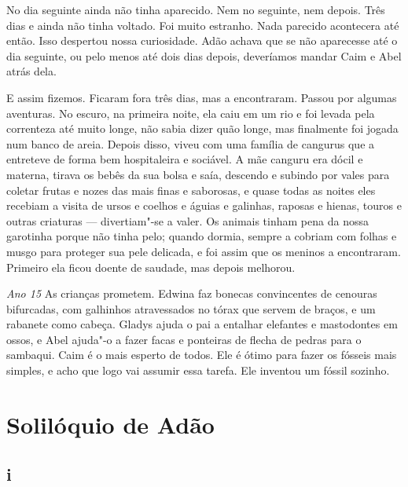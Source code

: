 No dia seguinte ainda não tinha aparecido. Nem no seguinte, nem depois.
Três dias e ainda não tinha voltado. Foi muito estranho. Nada parecido
acontecera até então. Isso despertou nossa curiosidade. Adão achava
que se não aparecesse até o dia seguinte, ou pelo menos até dois dias depois,     
deveríamos mandar Caim e Abel atrás dela.

E assim fizemos. Ficaram fora três dias, mas a encontraram. Passou por algumas
aventuras. No escuro, na primeira noite, ela caiu em um rio e foi levada pela
correnteza até muito longe, não sabia dizer quão longe, mas finalmente foi
jogada num banco de areia. Depois disso, viveu com uma família de cangurus
que a entreteve de forma bem hospitaleira e sociável. A mãe canguru
era dócil e materna, tirava os bebês da sua bolsa e saía, descendo e subindo
por vales para coletar frutas e nozes das mais finas e saborosas, e quase todas
as noites eles recebiam a visita de ursos e coelhos e águias e galinhas, raposas e
hienas, touros e outras criaturas --- divertiam"-se a valer. Os animais tinham
pena da nossa garotinha porque não tinha pelo; quando dormia, sempre a cobriam
com folhas e musgo para proteger sua pele delicada, e foi assim que os
meninos a encontraram. Primeiro ela ficou doente de saudade, mas depois
melhorou.


\textit{Ano 15} As crianças prometem. Edwina faz bonecas convincentes de cenouras
bifurcadas, com galhinhos atravessados no tórax que servem de braços, e um
rabanete como cabeça. Gladys ajuda o pai a entalhar elefantes e mastodontes em
ossos, e Abel ajuda"-o a fazer facas e ponteiras de flecha de pedras para o 
sambaqui. Caim é o mais esperto de todos. Ele é ótimo para fazer os 
fósseis mais simples, e acho que logo vai assumir essa tarefa. Ele inventou um 
fóssil sozinho.

\chapter{Solilóquio de Adão}
\medskip


\section*{i}

